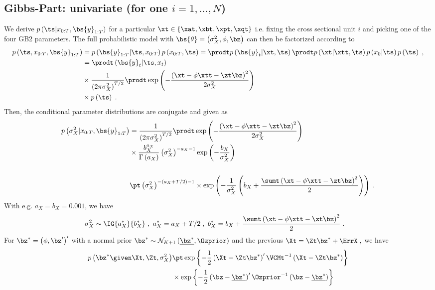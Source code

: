 \subsection{Gibbs-Part: univariate (for one $i=1,\ldots,N$)}
We derive $p\left(\ts|x_{0:T},\bs{y}_{1:T}\right)$ for a particular $\xt\in\left\lbrace\xat,\xbt,\xpt,\xqt\right\rbrace$ i.e. fixing the cross sectional  unit $i$ and picking one of the four GB2 parameters. The full probabilistic model with $\bs{\theta}=\left(\sigma_X^2,\phi,\bz\right)$ can then be factorized according to
\begin{align*}
p\left(\ts,x_{0:T},\bs{y}_{1:T}\right)
&=
p\left(\bs{y}_{1:T}|\ts,x_{0:T}\right)p\left(x_{0:T},\ts\right)
=
\prodt p\left(\bs{y}_t|\xt,\ts\right)
\prodt p\left(\xt|\xtt,\ts\right)p\left(x_0|\ts\right)p\left(\ts\right)\;,\\
&=
\prodt \left(\bs{y}_t|\ts,x_{t}\right) \\
&\times
\frac{1}{\left(2\pi\sigma_{X}^2\right)^{T/2}}\prodt \exp \left(-\frac{\left(\xt-\phi\xtt-\zt\bz\right)^2}{2\sigma_X^2}\right)\\
&\times p\left(\ts\right)\;.
\end{align*}
Then, the conditional parameter distributions are conjugate and given as
\begin{align*}
p\left(\sigma_X^2|x_{0:T},\bs{y}_{1:T}\right)
&=\frac{1}{\left(2\pi\sigma_{X}^2\right)^{T/2}}\prodt \exp \left(-\frac{\left(\xt-\phi\xtt-\zt\bz\right)^2}{2\sigma_X^2}\right)\\
&\times \frac{b_X^{a_X}}{\Gamma\left(a_X\right)}\left(\sigma_X^2\right)^{-a_X-1}\exp\left(-\frac{b_X}{\sigma_X^2}\right)\\
\\
&\pt \left(\sigma_X^2\right)^{-(a_X+T/2)-1}
\times\exp
\left(
-\frac{1}{\sigma_X^2}
\left(
b_X+\frac{\sumt\left(\xt-\phi\xtt-\zt\bz\right)^2}{2}
\right)
\right)\;.
\end{align*}
With e.g. $a_X=b_X=0.001$, we have
\begin{align*}
\sigma_X^2\sim\IG{a^*_X}{b^*_X}\;,~a^*_X&=a_X+T/2\;,~b^*_X=b_X+\frac{\sumt\left(\xt-\phi\xtt-\zt\bz\right)^2}{2}\;.
\end{align*}
For $\bz^*=\left(\phi,\bz^{\prime}\right)^{\prime}$ with a normal prior $\bz^*\sim\mathcal{N}_{K+1}\left(\underline{\bz^*}, \Ozprior\right)$ and the previous $\Xt=\Zt\bz^* + \ErrX\;,$ we have
\begin{align*}
p\left(\bz^*\given \Xt,\Zt,\sigma_X^2\right) 
& \pt
\exp\left\lbrace-\frac{1}{2}\left(\Xt-\Zt\bz^*\right)^{\prime}\VCMt^{-1}\left(\Xt-\Zt\bz^*\right)\right\rbrace\\
& \times 
\exp\left\lbrace-\frac{1}{2}\left(\bz-\underline{\bz^*}\right)^{\prime}\Ozprior^{-1}\left(\bz-\underline{\bz^*}\right)\right\rbrace\\
\end{align*}
